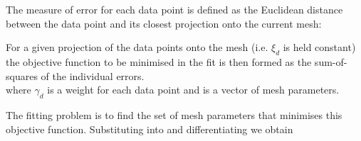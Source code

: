 The measure of error for each data point is defined as the Euclidean distance
between the data point and its closest projection onto the current mesh:
\begin{equation}
\end{equation} 

For a given projection of the data points onto the mesh (i.e. $\xi_{d}$ is
held constant) the objective function to be minimised in the fit is then formed
as the sum-of-squares of the individual errors.
\begin{equation}
  \label{eqn:linfitobjfun}
\end{equation}
where $\gamma_{d}$ is a weight for each data point and  is a vector of
mesh parameters.

The fitting problem is to find the set of mesh parameters that minimises 
this objective function. Substituting  into
 and differentiating we obtain
\begin{equation}
  \label{eqn:lindatajacnode}
\end{equation}
\begin{equation}
  \label{eqn:lindatajacderiv}
\end{equation}

